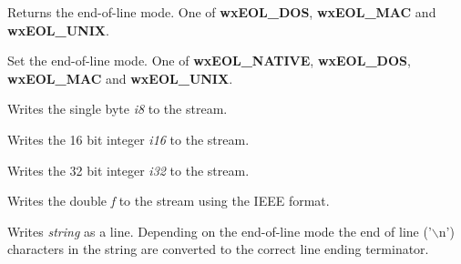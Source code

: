 Returns the end-of-line mode. One of {\bf wxEOL\_DOS}, {\bf wxEOL\_MAC} and {\bf wxEOL\_UNIX}.



Set the end-of-line mode. One of {\bf wxEOL\_NATIVE}, {\bf wxEOL\_DOS}, {\bf wxEOL\_MAC} and {\bf wxEOL\_UNIX}.



Writes the single byte {\it i8} to the stream.



Writes the 16 bit integer {\it i16} to the stream.



Writes the 32 bit integer {\it i32} to the stream.



Writes the double {\it f} to the stream using the IEEE format.



Writes {\it string} as a line. Depending on the end-of-line mode the end of
line ('$\backslash$n') characters in the string are converted to the correct
line ending terminator.


